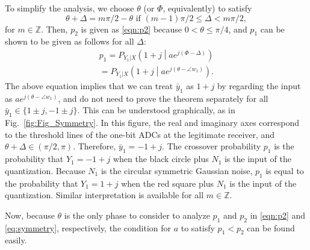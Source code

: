 \documentclass[journal]{IEEEtran}
\begin{document}
To simplify the analysis, we choose $\theta$ (or $\Phi$, equivalently) to satisfy
\begin{equation}
    \theta + \Delta = m\pi/2 - \theta \text{ if } (m-1)\pi/2 \leq \Delta < m\pi/2, \label{eq:alignment}
\end{equation}
for $m \in \mathbb{Z}$.
Then,  $p_2$ is given as \eqref{eqn:p2} because $0<\theta \leq \pi/4$, and $p_1$ can be shown to be given as follows for all $\Delta$: 
\begin{multline}
    p_1 = P_{Y_1|X}\left(1+j \middle| ae^{j(\Phi-\Delta)}\right) \\ = P_{Y_1|X}\left( 1+j \middle| ae^{j(\theta-\angle w_1 ) } \right). \label{eq:symmetry}
\end{multline}
The above equation implies that we can treat $\bar{y}_1$ as $1+j$ by regarding the input as $ae^{j(\theta-\angle w_1 )}$, and do not need to prove the theorem separately for all ${\bar{y}_1 \in \{ 1 \pm j, - 1 \pm j\}}$. 
This can be understood graphically, as in \mbox{Fig. \ref{fig:Fig_Symmetry}}. In this figure, the real and imaginary axes correspond to the threshold lines of the one-bit ADCs at the legitimate receiver, and $\theta + \Delta \in (\pi/2,\pi)$. Therefore, $\bar{y}_1 = -1+j$.
The crossover probability $p_1$ is the probability that $Y_1=-1+j$ when the black circle plus $N_1$ is the input of the quantization.
Because $N_1$ is the circular symmetric Gaussian noise, $p_1$ is equal to the probability that $Y_1=1+j$ when the red square plus $N_1$ is the input of the quantization. Similar interpretation is available for all $m \in \mathbb{Z}$.

Now, because $\theta$ is the only phase to consider to analyze $p_1$ and $p_2$ in \eqref{eqn:p2} and \eqref{eq:symmetry}, respectively, the condition for $a$ to satisfy $p_1<p_2$ can be found easily.
\end{document}
